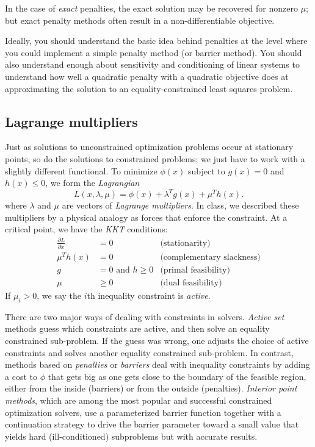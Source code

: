 \documentclass[12pt, leqno]{article}
\begin{document}
In the case of {\em exact} penalties, the exact solution may be
recovered for nonzero $\mu$; but exact penalty methods often result
in a non-differentiable objective.

Ideally, you should understand the basic idea behind penalties at the
level where you could implement a simple penalty method (or barrier
method).  You should also understand enough about sensitivity and
conditioning of linear systems to understand how well a quadratic
penalty with a quadratic objective does at approximating the solution
to an equality-constrained least squares problem.

\subsection{Lagrange multipliers}

Just as solutions to unconstrained optimization problems
occur at stationary points, so do the solutions to constrained
problems; we just have to work with a slightly different functional.
To minimize $\phi(x)$ subject to $g(x) = 0$ and $h(x) \leq 0$,
we form the {\em Lagrangian}
\[
  L(x,\lambda,\mu) = \phi(x) + \lambda^T g(x) + \mu^T h(x).
\]
where $\lambda$ and $\mu$ are vectors of {\em Lagrange multipliers}.
In class, we described these multipliers by a physical analogy as
forces that enforce the constraint.
At a critical point, we have the {\em KKT} conditions:
\begin{align*}
  \frac{\partial L}{\partial x} &= 0 & \mbox{(stationarity)}\\
  \mu^T h(x) & = 0 & \mbox{(complementary slackness)} \\
  g &= 0 \mbox{ and } h \geq 0 & \mbox{(primal feasibility)} \\
  \mu &\geq 0 & \mbox{(dual feasibility)}
\end{align*}
If $\mu_i > 0$, we say the $i$th inequality constraint is {\em active}.

There are two major ways of dealing with constraints in solvers.
{\em Active set} methods guess which constraints are active,
and then solve an equality constrained sub-problem.  If the guess
was wrong, one adjusts the choice of active constraints and solves
another equality constrained sub-problem.  In contrast, methods
based on {\em penalties} or {\em barriers} deal with inequality
constraints by adding a cost to $\phi$ that gets big as one
gets close to the boundary of the feasible region, either from the
inside (barriers) or from the outside (penalties).  
{\em Interior point methods}, which are among the most popular
and successful constrained optimization solvers, use a parameterized
barrier function together with a continuation strategy to drive the
barrier parameter toward a small value that yields hard
(ill-conditioned) subproblems but with accurate results.
\end{document}
